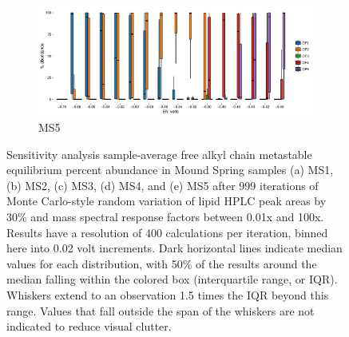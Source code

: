 \begin{figure}[h]\ContinuedFloat

    \begin{subfigure}[b]{\linewidth}
    	\includegraphics[width=\linewidth]{"figs_app2/boxplot_ggplot_02bin Mound OF5 iter 999"}
    	\caption{MS5}
        \label{fig:MS5_mc}
    \end{subfigure}
    
    \caption{Sensitivity analysis sample-average free alkyl chain metastable equilibrium percent abundance in Mound Spring samples (a) MS1, (b) MS2, (c) MS3, (d) MS4, and (e) MS5 after 999 iterations of Monte Carlo-style random variation of lipid HPLC peak areas by 30\% and mass spectral response factors between 0.01x and 100x. Results have a resolution of 400 calculations per iteration, binned here into 0.02 volt increments. Dark horizontal lines indicate median values for each distribution, with 50\% of the results around the median falling within the colored box (interquartile range, or IQR). Whiskers extend to an observation 1.5 times the IQR beyond this range. Values that fall outside the span of the whiskers are not indicated to reduce visual clutter.}
    \label{fig:MS_mc}
\end{figure}


\newpage

